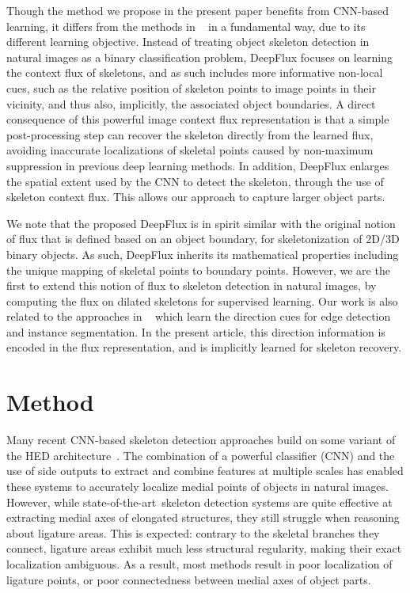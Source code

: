 \documentclass[10pt,twocolumn,letterpaper]{article}
\def\sota{state-of-the-art}
\begin{document}
\medskip
Though the method we propose in the present paper benefits from CNN-based learning, it differs from the methods in  ~\cite{shen2016fsds,shen2017lmsds,ke2017srn,liu2017twostream,zhao2018hifi,liu2018lsn} in a fundamental way, due to its different learning objective. Instead of treating object skeleton detection in natural images as a binary classification problem, DeepFlux focuses on learning the context flux of skeletons, and as such includes more informative non-local cues, such as the relative position of skeleton points to image points in their vicinity, and thus also, implicitly, the associated object boundaries. A direct consequence of this powerful image context flux representation is that a simple post-processing step can recover the skeleton directly from the learned flux, avoiding inaccurate localizations of skeletal points caused by non-maximum suppression in previous deep learning methods.
In addition, DeepFlux enlarges the spatial extent used by the CNN to detect the skeleton, through the use of skeleton context flux. This allows our approach to capture larger object parts.

We note that the proposed DeepFlux is in spirit similar with the original notion of flux \cite{siddiqi2002hamilton,dimitrov2003} that is defined based on an object boundary, for skeletonization of 2D/3D binary objects. As such, DeepFlux inherits its mathematical properties including the unique mapping of skeletal points to boundary points. However, we are the first to extend this notion of flux to skeleton detection in natural images, by computing the flux on dilated skeletons for supervised learning. Our work is also related to the approaches in ~\cite{bai2017deep,maninis2018convolutional} which learn the direction cues for edge detection and instance segmentation. In the present article, this direction information is encoded in the flux representation, and is implicitly learned for skeleton recovery.

\section{Method} \label{sec:method}
Many recent CNN-based skeleton detection approaches build on some variant of the HED architecture~\cite{xie2015hed}.
The combination of a powerful classifier (CNN) and the use of side outputs to extract and combine features at multiple scales has enabled these systems to accurately localize medial points of objects in natural images.
However, while \sota\ skeleton detection systems are quite effective at extracting medial axes of elongated structures, they still struggle when reasoning about
ligature areas.
This is expected: contrary to the skeletal branches they connect, ligature areas exhibit much less structural regularity, making their exact localization ambiguous.
As a result, most methods result in poor localization of ligature points, or poor connectedness between medial axes of object parts.
\end{document}
